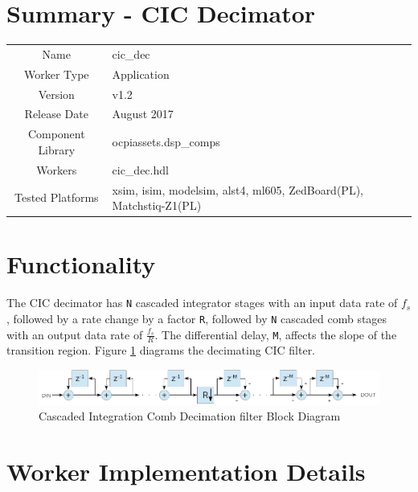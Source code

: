 \documentclass{article}
\author{} %
\date{Version \docVersion} %
\title{\docTitle}
\def\docVersion{1.2}
\def\comp{cic\_dec}
\def\Comp{CIC Decimator}
\begin{document}
\section*{Summary - \Comp}
\begin{tabular}{|c|M{13.5cm}|}
	\hline
	                  &                                                    \\
	\hline
	Name              & \comp                                              \\
	\hline
	Worker Type       & Application                                        \\
	\hline
	Version           & v\docVersion \\
	\hline
	Release Date      & August 2017 \\
	\hline
	Component Library & ocpiassets.dsp\_comps                              \\
	\hline
	Workers           & \comp.hdl                                          \\
	\hline
	Tested Platforms  & xsim, isim, modelsim, alst4, ml605, ZedBoard(PL), Matchstiq-Z1(PL) \\
	\hline
\end{tabular}

\section*{Functionality}
\begin{flushleft}
	The CIC decimator has \verb+N+ cascaded integrator stages with an input data rate of $f_{s}$, followed by a rate change by a factor \verb+R+, followed by \verb+N+ cascaded comb stages with an output data rate of $\frac{f_{s}}{R}$. The differential delay, \verb+M+, affects the slope of the transition region. Figure \ref{fig:cic} diagrams the decimating CIC filter.

	\begin{figure}[ht]
		\centering
		\includegraphics[scale=.6]{cic_decimator_block_diagram}
		\caption{Cascaded Integration Comb Decimation filter Block Diagram}
		\label{fig:cic}
	\end{figure}
\end{flushleft}

\section*{Worker Implementation Details}
\end{document}
